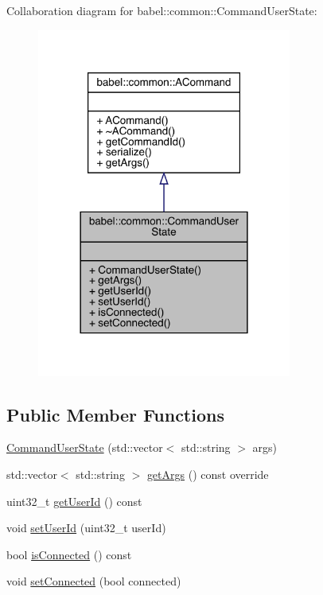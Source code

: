 Collaboration diagram for babel\+:\+:common\+:\+:Command\+User\+State\+:\nopagebreak
\begin{figure}[H]
\begin{center}
\leavevmode
\includegraphics[width=237pt]{classbabel_1_1common_1_1_command_user_state__coll__graph}
\end{center}
\end{figure}
\subsection*{Public Member Functions}
\begin{DoxyCompactItemize}
\item 
\mbox{\hyperlink{classbabel_1_1common_1_1_command_user_state_a4741021eb52f138b8a71a51c08ee8b47}{Command\+User\+State}} (std\+::vector$<$ std\+::string $>$ args)
\item 
std\+::vector$<$ std\+::string $>$ \mbox{\hyperlink{classbabel_1_1common_1_1_command_user_state_adab3d234b9ced9224e3036802cc2794d}{get\+Args}} () const override
\item 
uint32\+\_\+t \mbox{\hyperlink{classbabel_1_1common_1_1_command_user_state_a5df6c9b2d6ab2136a984e892560dd590}{get\+User\+Id}} () const
\item 
void \mbox{\hyperlink{classbabel_1_1common_1_1_command_user_state_a8daf12c220d8d2cd8bed4cdbc7b0e5b9}{set\+User\+Id}} (uint32\+\_\+t user\+Id)
\item 
bool \mbox{\hyperlink{classbabel_1_1common_1_1_command_user_state_af78075f29c5379c314f41b56b5118ef9}{is\+Connected}} () const
\item 
void \mbox{\hyperlink{classbabel_1_1common_1_1_command_user_state_a73fc9fad1f9e4154c5ba080ce929105d}{set\+Connected}} (bool connected)
\end{DoxyCompactItemize}


